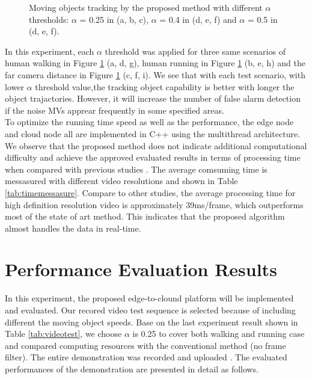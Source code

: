 \begin{figure}
{}
\caption{Moving objects tracking by the proposed method with different $\alpha$ thresholds: $\alpha$ = 0.25 in (a, b, c), $\alpha$ = 0.4 in (d, e, f) and $\alpha$ = 0.5 in (d, e, f).}
\label{fig:objecttracking}
\end{figure}
In this experiment, each $\alpha$ threshold was applied for three same scenarios of human walking in Figure \ref{fig:objecttracking} (a, d, g), human running in Figure \ref{fig:objecttracking} (b, e, h) and the far camera distance in Figure \ref{fig:objecttracking} (c, f, i).  We see that with each test scenario, with lower $\alpha$ threshold value,the tracking object capability is better with longer the object trajactories. However, it will increase the number of false alarm detection if the noise MVs apprear frequently in some specified areas.\\ To optimize the running time speed as well as the performance, the edge node and cloud node all are implemented in C++ using the multithread architecture. We observe that the proposed method does not indicate additional computational difficulty and achieve the approved evaluated results in terms of processing time when compared with previous studies \cite{bombardelli2018efficient} \cite{khatoonabadi2012video}. The average comsuming time  is messasured with different video resolutions and shown in Table \ref{tab:timemessasure}. Compare to other studies, the average processing time for high definition resolution video is approximately 39ms/frame, which outperforms most of the state of art method. This indicates that the proposed algorithm almost handles the data in real-time. 

\section{Performance Evaluation Results}
 In this experiment, the proposed edge-to-clound platform will be implemented and evaluated. Our recored video test sequence is selected because of including different the moving object speeds. Base on the last experiment result shown in Table \ref{tab:videotest}, we choose  $\alpha$ is 0.25 to cover both walking and running case and compared computing resources with the conventional method (no frame filter). The entire demonstration was recorded and uploaded \cite{source}. The evaluated performances of the demonstration are presented in detail as follows.
 
